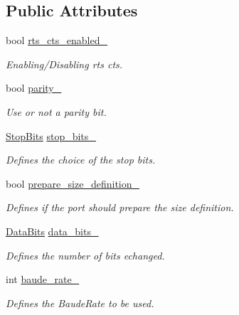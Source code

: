 \subsection*{Public Attributes}
\begin{DoxyCompactItemize}
\item 
bool \hyperlink{classreal__time__tools_1_1PortConfig_ad89a20459faf7718a63ea8c00ddc5e34}{rts\+\_\+cts\+\_\+enabled\+\_\+}
\begin{DoxyCompactList}\small\item\em Enabling/\+Disabling rts cts. \end{DoxyCompactList}\item 
bool \hyperlink{classreal__time__tools_1_1PortConfig_afdc811c6c73ada4b21dab246bf086506}{parity\+\_\+}\hypertarget{classreal__time__tools_1_1PortConfig_afdc811c6c73ada4b21dab246bf086506}{}\label{classreal__time__tools_1_1PortConfig_afdc811c6c73ada4b21dab246bf086506}

\begin{DoxyCompactList}\small\item\em Use or not a parity bit. \end{DoxyCompactList}\item 
\hyperlink{classreal__time__tools_1_1PortConfig_a62bbab15705e2d5a9bc17115222f7c07}{Stop\+Bits} \hyperlink{classreal__time__tools_1_1PortConfig_a3303d793237edbfa0b3c28f3f01c3837}{stop\+\_\+bits\+\_\+}
\begin{DoxyCompactList}\small\item\em Defines the choice of the stop bits. \end{DoxyCompactList}\item 
bool \hyperlink{classreal__time__tools_1_1PortConfig_a6c1dbeb3cf3c772c9c1b4df71b8befd6}{prepare\+\_\+size\+\_\+definition\+\_\+}\hypertarget{classreal__time__tools_1_1PortConfig_a6c1dbeb3cf3c772c9c1b4df71b8befd6}{}\label{classreal__time__tools_1_1PortConfig_a6c1dbeb3cf3c772c9c1b4df71b8befd6}

\begin{DoxyCompactList}\small\item\em Defines if the port should prepare the size definition. \end{DoxyCompactList}\item 
\hyperlink{classreal__time__tools_1_1PortConfig_a11e818aa26cd0a941ff00b9ccd4d2131}{Data\+Bits} \hyperlink{classreal__time__tools_1_1PortConfig_af80f9991e3811392385208a9baf9c6fd}{data\+\_\+bits\+\_\+}
\begin{DoxyCompactList}\small\item\em Defines the number of bits echanged. \end{DoxyCompactList}\item 
int \hyperlink{classreal__time__tools_1_1PortConfig_aa0be2d74f3ac70e9f43d36fc0c70901a}{baude\+\_\+rate\+\_\+}
\begin{DoxyCompactList}\small\item\em Defines the Baude\+Rate to be used. \end{DoxyCompactList}\end{DoxyCompactItemize}


